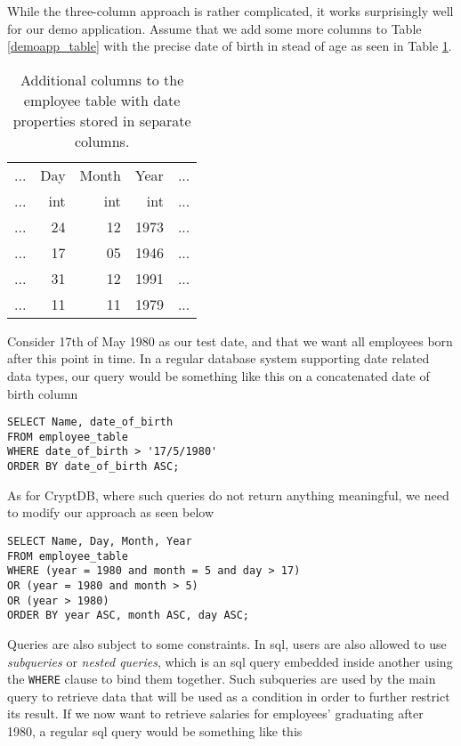 While the three-column approach is rather complicated, it works surprisingly well for our demo application. Assume that we add some more columns to Table \ref{demoapp_table} with the precise date of birth in stead of age as seen in Table \ref{tab:empl_date}.

\begin{table}[H]
\centering
\begin{tabular}{| c | r | r | r | c |}
\hline
  ... & Day & Month & Year & ... \\
  ... & int & int & int & ... \\
 \hline \hline
 ... & 24 & 12 & 1973  & ... \\
 ... & 17 & 05 & 1946 & ... \\
 ... & 31 & 12 & 1991 & ... \\
 ... & 11 & 11 & 1979  & ... \\
 \hline

\end{tabular}
\caption{Additional columns to the employee table with date properties stored in separate columns.}
\label{tab:empl_date}
\end{table}

Consider 17th of May 1980 as our test date, and that we want all employees born after this point in time. In a regular database system supporting date related data types, our query would be something like this on a concatenated date of birth column

\begin{verbatim}
SELECT Name, date_of_birth
FROM employee_table
WHERE date_of_birth > '17/5/1980'
ORDER BY date_of_birth ASC;
\end{verbatim}

As for CryptDB, where such queries do not return anything meaningful, we need to modify our approach as seen below

\begin{verbatim}
SELECT Name, Day, Month, Year
FROM employee_table
WHERE (year = 1980 and month = 5 and day > 17)
OR (year = 1980 and month > 5)
OR (year > 1980)
ORDER BY year ASC, month ASC, day ASC;
\end{verbatim}

Queries are also subject to some constraints. In \gls{sql}, users are also allowed to use \emph{subqueries} or \emph{nested queries}, which is an \gls{sql} query embedded inside another using the \verb!WHERE! clause to bind them together. Such subqueries are used by the main query to retrieve data that will be used as a condition in order to further restrict its result. If we now want to retrieve salaries for employees' graduating after 1980, a regular \gls{sql} query would be something like this

